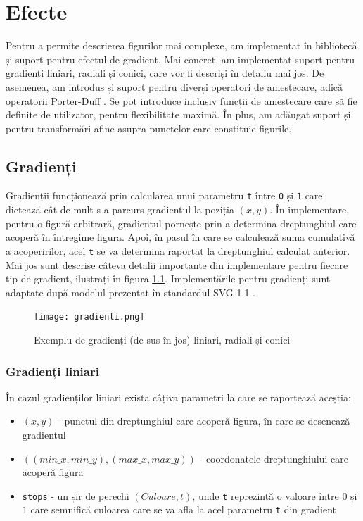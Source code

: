 \documentclass[a4paper, 12pt]{report}
\begin{document}
\chapter{Efecte}

Pentru a permite descrierea figurilor mai complexe, am implementat în bibliotecă și suport pentru efectul de gradient.
Mai concret, am implementat suport pentru gradienți liniari, radiali și conici, care vor fi descriși în detaliu mai jos.
De asemenea, am introdus și suport pentru diverși operatori de amestecare, adică operatorii Porter-Duff \cite{Porter-Duff}.
Se pot introduce inclusiv funcții de amestecare care să fie definite de utilizator, pentru flexibilitate maximă. În plus,
am adăugat suport și pentru transformări afine asupra punctelor care constituie figurile.

\section{Gradienți}

Gradienții funcționează prin calcularea unui parametru \texttt{t} între \texttt{0} și \texttt{1} care dictează cât de mult
s-a parcurs gradientul la poziția \((x, y)\). În implementare, pentru o figură arbitrară, gradientul pornește prin a
determina dreptunghiul care acoperă în întregime figura. Apoi, în pasul în care se calculează suma cumulativă a acoperirilor,
acel \texttt{t} se va determina raportat la dreptunghiul calculat anterior. Mai jos sunt descrise câteva detalii importante din
implementare pentru fiecare tip de gradient, ilustrați în figura \ref{fig-gradients}. Implementările pentru gradienți sunt adaptate
după modelul prezentat în standardul SVG 1.1 \cite{SVG_Gradients}.

\begin{figure}[ht]
    \texttt{[image: gradienti.png]}
    \centering
    \caption{Exemplu de gradienți (de sus în jos) liniari, radiali și conici}
    \label{fig-gradients}
\end{figure}

\subsection{Gradienți liniari}

În cazul gradienților liniari există câțiva parametri la care se raportează aceștia:

\begin{itemize}
    \item{\((x, y)\) - punctul din dreptunghiul care acoperă figura, în care se desenează gradientul}
    \item{\(((min\_x, min\_y), (max\_x, max\_y))\) - coordonatele dreptunghiului care acoperă figura}
    \item{\texttt{stops} - un șir de perechi \((Culoare, t)\), unde \texttt{t} reprezintă o valoare între \(0\) și \(1\)
                care semnifică culoarea care se va afla la acel parametru \texttt{t} din gradient}
\end{itemize}
\end{document}
